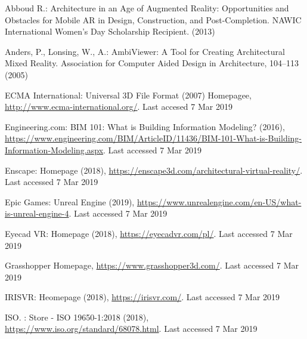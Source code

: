 \documentclass[runningheads]{llncs}
\begin{document}
%
%
%
% 
% 
%
\begin{thebibliography}{8}
Abboud R.: Architecture in an Age of Augmented Reality:  
Opportunities and Obstacles for Mobile AR in Design, Construction, and Post-Completion.  NAWIC International Women’s Day Scholarship Recipient. (2013)

Anders, P., Lonsing, W., A.: AmbiViewer: A Tool for Creating Architectural Mixed Reality. Association for Computer Aided Design in Architecture, 104--113 (2005)

ECMA International: Universal 3D File Format (2007) Homepagee, 
\url{http://www.ecma-international.org/}. Last accesed 7 Mar 2019

Engineering.com: BIM 101: What is Building Information Modeling? (2016), \url{https://www.engineering.com/BIM/ArticleID/11436/BIM-101-What-is-Building-Information-Modeling.aspx}. Last accessed 7 Mar 2019

Enscape: Homepage (2018), \url{https://enscape3d.com/architectural-virtual-reality/}. Last accessed 7 Mar 2019

Epic Games: Unreal Engine (2019), \url{https://www.unrealengine.com/en-US/what-is-unreal-engine-4}. Last accessed 7 Mar 2019

Eyecad VR: Homepage (2018), \url{https://eyecadvr.com/pl/}. Last accessed 7 Mar 2019

Grasshopper Homepage, \url{https://www.grasshopper3d.com/}. Last accessed 7 Mar 2019

IRISVR: Heomepage (2018), \url{https://irisvr.com/}. Last accessed 7 Mar 2019

ISO. : Store - ISO 19650-1:2018 (2018), \url{https://www.iso.org/standard/68078.html}. 
Last accessed 7 Mar 2019


\end{thebibliography}
\end{document}
